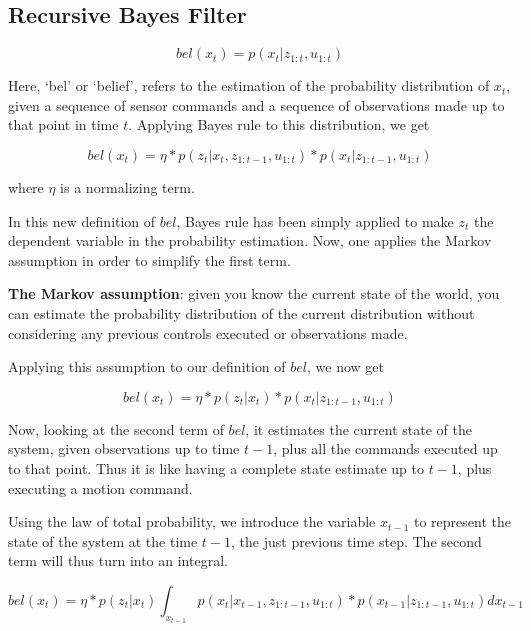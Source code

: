 \documentclass[a4paper]{article}
\begin{document}
\subsection{Recursive Bayes Filter }

\begin{equation*}
    bel(x_t) = p(x_t | z_{1:t}, u_{1:t})
\end{equation*}

Here, `bel' or `belief', refers to the estimation of the probability distribution of $x_t$, given a sequence of sensor commands and a sequence of observations made up to that point in time $t$. Applying Bayes rule to this distribution, we get

\begin{equation*}
    bel(x_t) = \eta * p(z_t | x_t, z_{1:t-1}, u_{1:t})* p(x_t | z_{1:t-1}, u_{1:t})
\end{equation*}

where $\eta$ is a normalizing term.

In this new definition of $bel$, Bayes rule has been simply applied  to make $z_t$ the dependent variable in the probability estimation. Now, one applies the Markov assumption in order to simplify the first term.

\textbf{The Markov assumption}: given you know the current state of the world, you can estimate the probability distribution of the current distribution without considering any previous controls executed or observations made.

Applying this assumption to our definition of $bel$, we now get

\begin{equation*}
    bel(x_t) = \eta * p(z_t | x_t) * p(x_t | z_{1:t-1}, u_{1:t})
\end{equation*}

Now, looking at the second term of $bel$, it estimates the current state of the system, given observations up to time $t-1$, plus all the commands executed up to that point. Thus it is like having a complete state estimate up to $t-1$, plus executing a motion command.

Using the law of total probability, we introduce the variable $x_{t-1}$ to represent the state of the system at the time $t-1$, the just previous time step. The second term will thus turn into an integral.

\begin{equation*}
    bel(x_t) = \eta * p(z_t | x_t)  \int_{x_{t-1}} p(x_t | x_{t-1}, z_{1:t-1}, u_{1:t}) * p(x_{t-1} | z_{1:t-1}, u_{1:t}) dx_{t-1}
\end{equation*}
\end{document}
